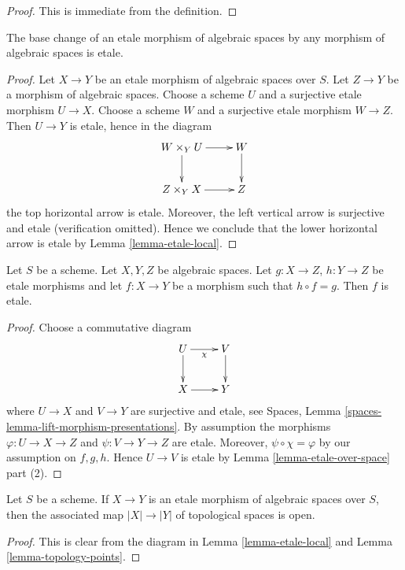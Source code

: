 \begin{proof}
This is immediate from the definition.
\end{proof}

\begin{lemma}
\label{lemma-base-change-etale}
The base change of an etale morphism of algebraic spaces
by any morphism of algebraic spaces is etale.
\end{lemma}

\begin{proof}
Let $X \to Y$ be an etale morphism of algebraic spaces over $S$.
Let $Z \to Y$ be a morphism of algebraic spaces.
Choose a scheme $U$ and a surjective etale morphism $U \to X$.
Choose a scheme $W$ and a surjective etale morphism $W \to Z$.
Then $U \to Y$ is etale, hence in the diagram
$$
\xymatrix{
W \times_Y U \ar[d] \ar[r] & W \ar[d] \\
Z \times_Y X \ar[r] & Z
}
$$
the top horizontal arrow is etale.
Moreover, the left vertical arrow is surjective
and etale (verification omitted). Hence we conclude that the lower
horizontal arrow is etale by Lemma \ref{lemma-etale-local}.
\end{proof}

\begin{lemma}
\label{lemma-etale-permanence}
Let $S$ be a scheme. Let $X, Y, Z$ be algebraic spaces.
Let $g : X \to Z$, $h : Y \to Z$ be etale morphisms and let
$f : X \to Y$ be a morphism such that $h \circ f = g$.
Then $f$ is etale.
\end{lemma}

\begin{proof}
Choose a commutative diagram
$$
\xymatrix{
U \ar[d] \ar[r]_\chi & V \ar[d] \\
X \ar[r] & Y
}
$$
where $U \to X$ and $V \to Y$ are surjective and etale, see
Spaces, Lemma \ref{spaces-lemma-lift-morphism-presentations}.
By assumption the morphisms $\varphi : U \to X \to Z$ and
$\psi : V \to Y \to Z$ are etale. Moreover, $\psi \circ \chi = \varphi$
by our assumption on $f, g, h$.
Hence $U \to V$ is etale by Lemma \ref{lemma-etale-over-space}
part (2).
\end{proof}

\begin{lemma}
\label{lemma-etale-open}
Let $S$ be a scheme.
If $X \to Y$ is an etale morphism of algebraic spaces over $S$,
then the associated map $|X| \to |Y|$ of topological spaces
is open.
\end{lemma}

\begin{proof}
This is clear from the diagram in
Lemma \ref{lemma-etale-local} and Lemma \ref{lemma-topology-points}.
\end{proof}

